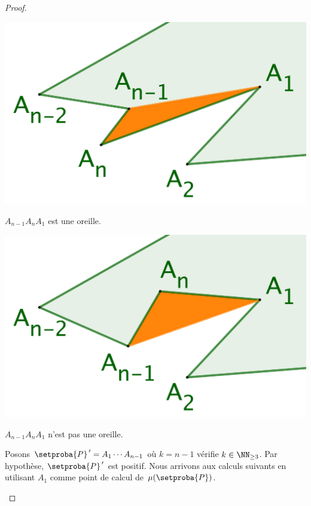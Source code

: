 \begin{proof}
\begin{itemize}
	    \begin{multicols}{2}
    	    \small\itshape
    		\begin{center}
        	\includegraphics[scale=.4]{content/polygon/alg-area/triangulation-proof-OK.png}

	        	\smallskip
    	   		$A_{n-1} A_n A_1$ est une oreille.
    	\end{center}

	    	\begin{center}
        	\includegraphics[scale=.4]{content/polygon/alg-area/triangulation-proof-KO.png}

        		\smallskip
    	   		$A_{n-1} A_n A_1$ n'est pas une oreille.
    		\end{center}
    	\end{multicols}


		\noindent
		Posons $\setproba{P}^{\,\prime} = A_1 \cdots A_{n-1}$ où $k = n-1$ vérifie $k \in \NN_{\geq3}$. Par hypothèse, $\setproba{P}^{\,\prime}$ est positif. 
		Nous arrivons aux calculs suivants en utilisant $A_1$ comme point de calcul de $\mu(\setproba{P})$.


\end{itemize}
\end{proof}
